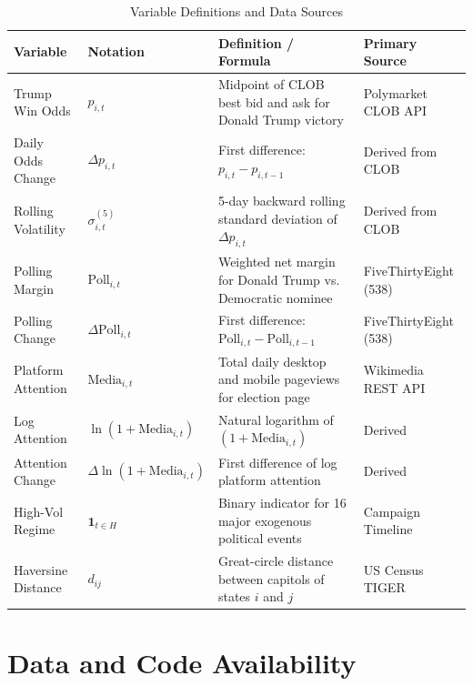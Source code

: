 \documentclass[12pt, a4paper]{article}
\begin{document}
\begin{table}[htbp]
\centering
\caption{Variable Definitions and Data Sources}
\label{tab:variables}
\footnotesize
\setlength{\tabcolsep}{4pt}
\begin{tabular}{p{2.3cm}p{2.2cm}p{6.6cm}p{3.3cm}}
\toprule
Variable & Notation & Definition / Formula & Primary Source \\
\midrule
Trump Win Odds & $p_{i,t}$ & Midpoint of CLOB best bid and ask for Donald Trump victory & Polymarket CLOB API \\
Daily Odds Change & $\Delta p_{i,t}$ & First difference: $p_{i,t} - p_{i,t-1}$ & Derived from CLOB \\
Rolling Volatility & $\sigma_{i,t}^{(5)}$ & 5-day backward rolling standard deviation of $\Delta p_{i,t}$ & Derived from CLOB \\
Polling Margin & $\text{Poll}_{i,t}$ & Weighted net margin for Donald Trump vs. Democratic nominee & FiveThirtyEight (538) \\
Polling Change & $\Delta \text{Poll}_{i,t}$ & First difference: $\text{Poll}_{i,t} - \text{Poll}_{i,t-1}$ & FiveThirtyEight (538) \\
Platform Attention & $\text{Media}_{i,t}$ & Total daily desktop and mobile pageviews for election page & Wikimedia REST API \\
Log Attention & $\ln(1+\text{Media}_{i,t})$ & Natural logarithm of $(1 + \text{Media}_{i,t})$ & Derived \\
Attention Change & $\Delta \ln(1+\text{Media}_{i,t})$ & First difference of log platform attention & Derived \\
High-Vol Regime & $\mathbf{1}_{t \in H}$ & Binary indicator for 16 major exogenous political events & Campaign Timeline \\
Haversine Distance & $d_{ij}$ & Great-circle distance between capitols of states $i$ and $j$ & US Census TIGER \\
\bottomrule
\end{tabular}
\end{table}

\section{Data and Code Availability}
\label{app:package}
\end{document}
